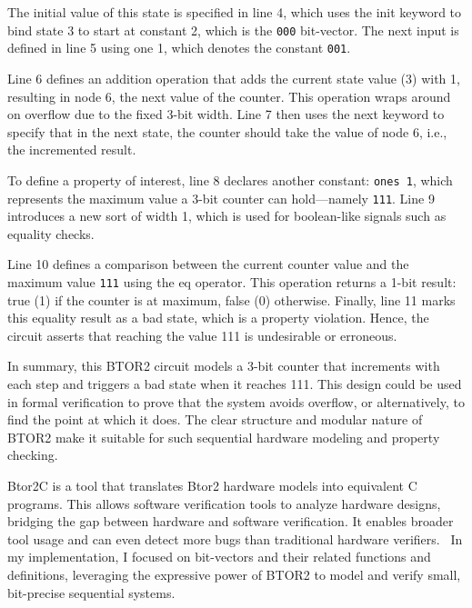 The initial value of this state is specified in line 4, which uses the init keyword to bind state 3 to start at constant 2, which is the \verb|000| bit-vector. The next input is defined in line 5 using one 1, which denotes the constant \verb|001|.

Line 6 defines an addition operation that adds the current state value (3) with 1, resulting in node 6, the next value of the counter. This operation wraps around on overflow due to the fixed 3-bit width. Line 7 then uses the next keyword to specify that in the next state, the counter should take the value of node 6, i.e., the incremented result.

To define a property of interest, line 8 declares another constant: \verb|ones 1|, which represents the maximum value a 3-bit counter can hold—namely \verb|111|. Line 9 introduces a new sort of width 1, which is used for boolean-like signals such as equality checks.

Line 10 defines a comparison between the current counter value and the maximum value \verb|111| using the eq operator. This operation returns a 1-bit result: true (1) if the counter is at maximum, false (0) otherwise. Finally, line 11 marks this equality result as a bad state, which is a property violation. Hence, the circuit asserts that reaching the value 111 is undesirable or erroneous.

In summary, this BTOR2 circuit models a 3-bit counter that increments with each step and triggers a bad state when it reaches 111. This design could be used in formal verification to prove that the system avoids overflow, or alternatively, to find the point at which it does. The clear structure and modular nature of BTOR2 make it suitable for such sequential hardware modeling and property checking.

Btor2C is a tool that translates Btor2 hardware models into equivalent C programs. This allows software verification tools to analyze hardware designs, bridging the gap between hardware and software verification. It enables broader tool usage and can even detect more bugs than traditional hardware verifiers.~\cite{btor2c}
\cite{btor2}
In my implementation, I focused on bit-vectors and their related functions and definitions, leveraging the expressive power of BTOR2 to model and verify small, bit-precise sequential systems.

